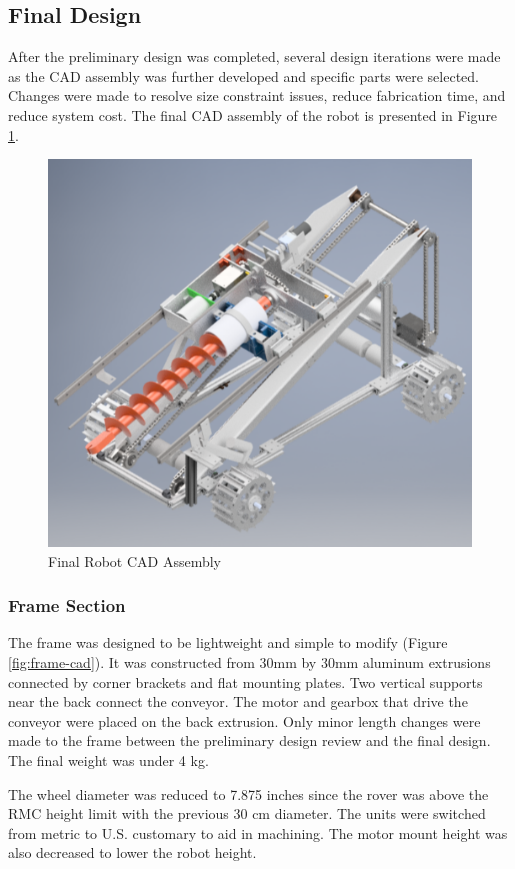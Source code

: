 \documentclass[class=article, crop=false]{standalone}
\begin{document}
	\subsection{Final Design}
	\label{subsec:final-design}
	
	After the preliminary design was completed, several design iterations were made as the CAD assembly was further developed and specific parts were selected. Changes were made to resolve size constraint issues, reduce fabrication time, and reduce system cost. The final CAD assembly of the robot is presented in Figure \ref{fig:final-cad}.
	
	\FloatBarrier
	\begin{figure}[h]
	\centering
	 \includegraphics[width=0.5\linewidth]{09_Figures/final-cad.jpg}
	 \caption{Final Robot CAD Assembly}
	 \label{fig:final-cad}
	\end{figure}
	\FloatBarrier
	
	\subsubsection{Frame Section}
	
	The frame was designed to be lightweight and simple to modify (Figure \ref{fig:frame-cad}). It was constructed from 30mm by 30mm aluminum extrusions connected by corner brackets and flat mounting plates. Two vertical supports near the back connect the conveyor. The motor and gearbox that drive the conveyor were placed on the back extrusion. Only minor length changes were made to the frame between the preliminary design review and the final design. The final weight was under 4 kg.
	
	The wheel diameter was reduced to 7.875 inches since the rover was above the RMC height limit with the previous 30 cm diameter. The units were switched from metric to U.S. customary to aid in machining. The motor mount height was also decreased to lower the robot height.
\end{document}
